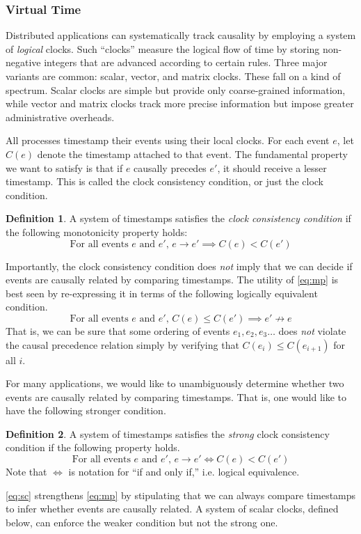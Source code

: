 \documentclass[]             %
{NASA}                       %
\theoremstyle{definition}
\newtheorem{definition}{Definition}[section]
\begin{document}
\subsubsection{Virtual Time}
\label{ssec:timestamps}
Distributed applications can systematically track causality by
employing a system of \emph{logical} clocks. Such ``clocks'' measure
the logical flow of time by storing non-negative integers that are
advanced according to certain rules. Three major variants are common:
scalar, vector, and matrix clocks. These fall on a kind of spectrum.
Scalar clocks are simple but provide only coarse-grained information,
while vector and matrix clocks track more precise information but
impose greater administrative overheads.

All processes timestamp their events using their local clocks. For
each event $e$, let $C(e)$ denote the timestamp attached to that
event. The fundamental property we want to satisfy is that if $e$
causally precedes $e'$, it should receive a lesser timestamp. This is
called the clock consistency condition, or just the clock condition.
\begin{definition}
  A system of timestamps satisfies the \emph{clock consistency
  condition} if the following monotonicity property holds:
  \[ \textrm{For all events $e$ and $e'$, } e \to e' \implies C(e) < C(e') \label{eq:mp}\tag{CC} \]
\end{definition}

Importantly, the clock consistency condition does \emph{not} imply
that we can decide if events are causally related by comparing
timestamps. The utility of \eqref{eq:mp} is best seen by re-expressing
it in terms of the following logically equivalent condition.
\[ \textrm{For all events $e$ and $e'$, }C(e) \leq C(e') \implies e'
  \not\to e \label{eq:mp-conv} \] That is, we can be sure that some
ordering of events $e_1, e_2, e_3\ldots$ does \emph{not} violate the
causal precedence relation simply by verifying that
$C(e_{i}) \leq C(e_{i+1})$ for all $i$.

For many applications, we would like to unambiguously determine
whether two events are causally related by comparing timestamps. That
is, one would like to have the following stronger condition.
\begin{definition}
  A system of timestamps satisfies the \emph{strong} clock consistency
  condition if the following property holds.
  \[ \textrm{For all events $e$ and $e'$, } e \to e' \iff C(e) < C(e') \label{eq:sc}\tag{SC} \]
  Note that $\iff$ is notation for ``if and only if,'' i.e. logical equivalence.
\end{definition}
\ref{eq:sc} strengthens \ref{eq:mp} by stipulating that we can always
compare timestamps to infer whether events are causally related. A
system of scalar clocks, defined below, can enforce the weaker
condition but not the strong one.
\end{document}
